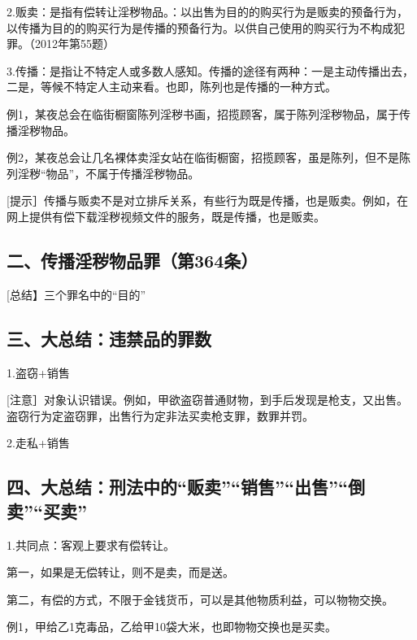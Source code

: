 2.贩卖：是指有偿转让淫秽物品。：以出售为目的的购买行为是贩卖的预备行为，以传播为目的的购买行为是传播的预备行为。以供自己使用的购买行为不构成犯罪。（2012年第55题）

3.传播：是指让不特定人或多数人感知。传播的途径有两种：一是主动传播出去，二是，等候不特定人主动来看。也即，陈列也是传播的一种方式。

例1，某夜总会在临街橱窗陈列淫秽书画，招揽顾客，属于陈列淫秽物品，属于传播淫秽物品。

例2，某夜总会让几名裸体卖淫女站在临街橱窗，招揽顾客，虽是陈列，但不是陈列淫秽“物品”，不属于传播淫秽物品。

[提示］传播与贩卖不是对立排斥关系，有些行为既是传播，也是贩卖。例如，在网上提供有偿下载淫秽视频文件的服务，既是传播，也是贩卖。

\subsection*{二、传播淫秽物品罪（第364条）}

[总结】三个罪名中的“目的”


\subsection*{三、大总结：违禁品的罪数}

1.盗窃+销售


[注意］对象认识错误。例如，甲欲盗窃普通财物，到手后发现是枪支，又出售。盗窃行为定盗窃罪，出售行为定非法买卖枪支罪，数罪并罚。

2.走私+销售


\subsection*{四、大总结：刑法中的“贩卖”“销售”“出售”“倒卖”“买卖”}

1.共同点：客观上要求有偿转让。

第一，如果是无偿转让，则不是卖，而是送。

第二，有偿的方式，不限于金钱货币，可以是其他物质利益，可以物物交换。

例1，甲给乙1克毒品，乙给甲10袋大米，也即物物交换也是买卖。

